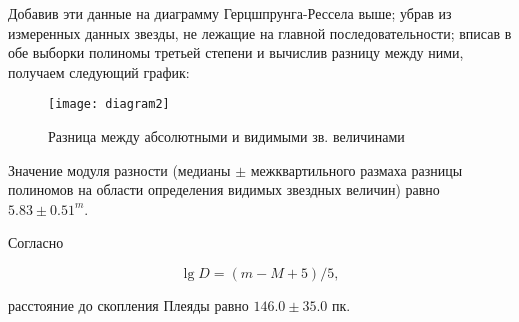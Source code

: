 Добавив эти данные на диаграмму Герцшпрунга-Рессела выше; убрав из измеренных данных звезды, не лежащие на главной последовательности; вписав в обе выборки полиномы третьей степени и вычислив разницу между ними, получаем следующий график:

\newpage

\begin{figure}[h]
  \centering
  \texttt{[image: diagram2]}
  \caption{Разница между абсолютными и видимыми зв. величинами}
\end{figure}

Значение модуля разности (медианы $\pm$ межквартильного размаха разницы полиномов на области определения видимых звездных величин) равно $ 5.83 \pm 0.51 ^m $. \npar

Согласно

\su
$$
\lg{D} = (m - M + 5) / 5,
$$
\su

расстояние до скопления Плеяды равно $ 146.0 \pm 35.0 $ пк.

